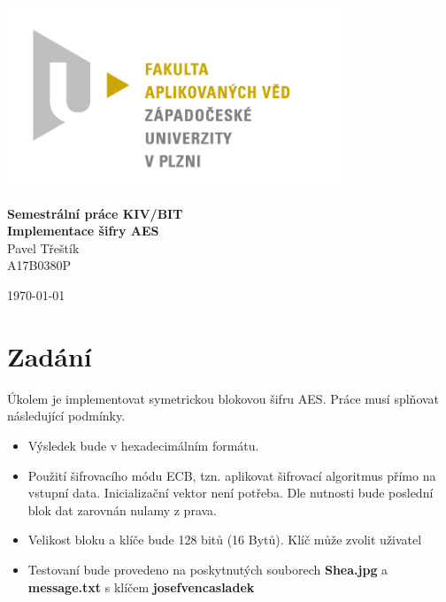 \documentclass[12pt]{article}
\begin{document}
\begin{titlepage}
\centerline{\includegraphics[width=10cm]{img/logo.jpg}}
\begin{center}
\vspace{30px}
{\Huge
\textbf{Semestrální práce KIV/BIT}\\
\vspace{1cm}
}
{\Large
\textbf{Implementace šifry AES}\\
}
\vspace{1cm}
{\large
Pavel Třeštík\\
}
{\normalsize
A17B0380P
}
\end{center}
\vspace{\fill}
\hfill
\begin{minipage}[t]{7cm}
\flushright
\today
\end{minipage}
\end{titlepage}

\tableofcontents
\newpage
{} %
%
%
\section{Zadání}
Úkolem je implementovat symetrickou blokovou šifru AES. Práce musí splňovat
následující podmínky.
\begin{itemize}
	\item Výsledek bude v hexadecimálním formátu.
	\item Použití šifrovacího módu ECB, tzn. aplikovat šifrovací algoritmus
		přímo na vstupní data. Inicializační vektor není potřeba.
		Dle nutnosti bude poslední blok dat zarovnán nulamy z prava.
	\item Velikost bloku a klíče bude 128 bitů (16 Bytů). Klíč může zvolit
		uživatel
	\item Testovaní bude provedeno na poskytnutých souborech \textbf{Shea.jpg}
		a \textbf{message.txt} s klíčem \textbf{josefvencasladek}
\end{itemize}
%
%
\pagebreak
%
\end{document}
